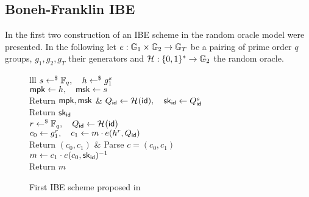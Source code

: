 
\subsection{Boneh-Franklin IBE}

In \cite{C:BonFra01} the first two construction of an IBE scheme in the random oracle model were presented. 
In the following let $e : \mathbb{G}_1 \times \mathbb{G}_2 \to \mathbb{G}_T$ be a pairing of prime order $q$ groups, $g_1, g_2, g_T$ their generators and $\mathcal{H}_{} : \{0,1\}^\ast \to \mathbb{G}_2$ the random oracle.

\begin{figure}[htb]
\centering
\begin{pcarray}{lll}
		{
			$s \gets^{\$} \mathbb{F}_q, \quad h \gets^{\$} g_1^s$
				\\
			$\mathsf{mpk} \gets h, \quad \mathsf{msk} \gets s$
				\\
			Return $\mathsf{mpk}, \mathsf{msk}$
		}
	&
		{
			$Q_{\mathsf{id}} \gets \mathcal{H}_{}(\mathsf{id}), \quad \mathsf{sk}_{\mathsf{id}} \gets Q_{\mathsf{id}}^s$
				\\
			Return $\mathsf{sk}_{\mathsf{id}}$
		}
	\\
			{
				$r \gets^{\$} \mathbb{F}_q, \quad Q_{\mathsf{id}} \gets \mathcal{H}_{}(\mathsf{id})$
					\\
				$c_0 \gets g_1^r, \quad c_1 \gets m \cdot e(h^r, Q_{\mathsf{id}})$
					\\
				Return $(c_0, c_1)$
			}
	&
		{
			Parse $c = (c_0, c_1)$
				\\
			$m \gets c_1 \cdot e(c_0, \mathsf{sk}_{\mathsf{id}})^{-1}$
				\\
			Return $m$
		}
\end{pcarray}
\caption{First IBE scheme proposed in \cite{C:BonFra01}}
\label{prot:BonFra01:first}
\end{figure}

